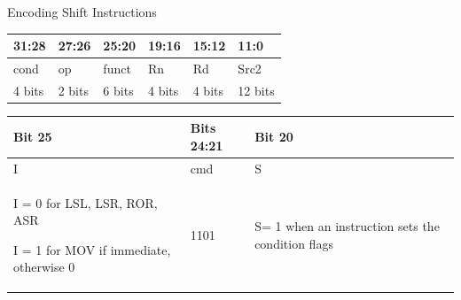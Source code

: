 \documentclass[aspectratio=169]{beamer}
\begin{document}
\begin{frame}{Encoding Shift Instructions}
    
    \begin{center}
        \begin{tabular}{|p{4em}|p{4em}|p{4em}|p{4em}|p{4em}|p{4em}|}
        \hline
        31:28 & 27:26 & 25:20 & 19:16 & 15:12 & 11:0 \\
        \hline
        cond & op & funct & Rn & Rd & Src2 \\
        \hline
        4 bits & 2 bits & 6 bits & 4 bits & 4 bits & 12 bits \\
        \hline
        \end{tabular}
    
        \vspace{0.5cm}
    
        \begin{tabular}{|p{13em}|p{9em}|p{11em}|}
            \hline
            Bit 25 & Bits 24:21 & Bit 20\\
            \hline
            I & cmd & S \\
            \hline
            I = 0 for LSL, LSR, ROR, ASR 
            
            I = 1 for MOV if immediate, otherwise 0
            & 1101 & S= 1 when an instruction sets the condition flags\\
            \hline
        \end{tabular}
    \end{center}

\end{frame}
\end{document}
